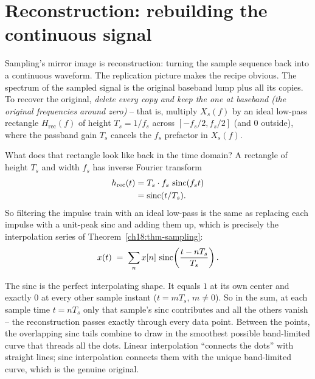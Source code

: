 \section{Reconstruction: rebuilding the continuous signal}
\label{ch18:reconstruction}

Sampling's mirror image is reconstruction: turning the sample sequence back into a
continuous waveform. The replication picture makes the recipe obvious. The spectrum of
the sampled signal is the original baseband lump plus all its copies. To recover the
original, \emph{delete every copy and keep the one at baseband (the original frequencies around zero)} -- that is, multiply $X_s(f)$ by an ideal low-pass rectangle $H_{\text{rec}}(f)$ of height $T_s = 1/f_s$ across $[-f_s/2, f_s/2]$ (and $0$ outside), where the passband gain $T_s$ cancels the $f_s$ prefactor in $X_s(f)$.

What does that rectangle look like back in the time domain? A rectangle of height $T_s$ and width $f_s$ has inverse Fourier transform
\begin{align*}
  h_{\text{rec}}(t) &= T_s\cdot f_s\,\operatorname{sinc}(f_s t) \\
                    &= \operatorname{sinc}(t/T_s).
\end{align*}
So filtering the impulse train with
an ideal low-pass is the same as replacing each impulse with a unit-peak sinc and adding them up,
which is precisely the interpolation series of Theorem~\ref{ch18:thm-sampling}:
\[
  x(t) \;=\; \sum_{n} x[n]\,\operatorname{sinc}\!\left(\frac{t - nT_s}{T_s}\right).
\]

\begin{intuitionbox}
The sinc is the perfect interpolating shape. It equals $1$ at its own center and
exactly $0$ at every other sample instant ($t = mT_s$, $m\ne 0$). So in the sum, at each
sample time $t=nT_s$ only that sample's sinc contributes and all the others vanish --
the reconstruction passes exactly through every data point. Between the points, the
overlapping sinc tails combine to draw in the smoothest possible band-limited curve
that threads all the dots. Linear interpolation ``connects the dots'' with straight
lines; sinc interpolation connects them with the unique band-limited curve, which is
the genuine original.
\end{intuitionbox}

